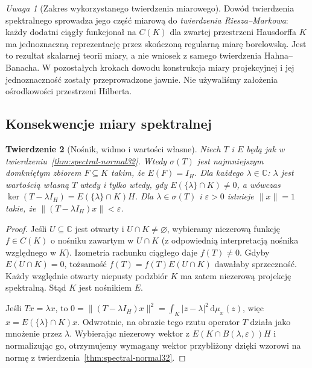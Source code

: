 \documentclass[11pt,a4paper]{article}
\numberwithin{equation}{section}
\theoremstyle{plain}
\newtheorem{twierdzenie}{Twierdzenie}[section]
\theoremstyle{definition}
\theoremstyle{remark}
\newtheorem{uwaga}[twierdzenie]{Uwaga}
\newcommand{\C}{\mathbb C}
\begin{document}
\begin{uwaga}[Zakres wykorzystanego twierdzenia miarowego]
Dowód twierdzenia spektralnego sprowadza jego część miarową
do \emph{twierdzenia Riesza--Markowa}: każdy dodatni ciągły
funkcjonał na $C(K)$ dla zwartej przestrzeni Hausdorffa $K$
ma jednoznaczną reprezentację przez skończoną regularną miarę
borelowską. Jest to rezultat skalarnej teorii miary, a nie
wniosek z samego twierdzenia Hahna--Banacha. W pozostałych
krokach dowodu konstrukcja miary projekcyjnej i jej jednoznaczność
zostały przeprowadzone jawnie. Nie używaliśmy założenia
ośrodkowości przestrzeni Hilberta.
\end{uwaga}

\subsection{Konsekwencje miary spektralnej}

\begin{twierdzenie}[Nośnik, widmo i wartości własne]
\label{thm:spectral-support32}
Niech $T$ i $E$ będą jak w twierdzeniu~\ref{thm:spectral-normal32}.
Wtedy $\sigma(T)$ jest najmniejszym domkniętym zbiorem
$F\subseteq K$ takim, że $E(F)=I_H$.
Dla każdego $\lambda\in\C$:
$\lambda$ jest wartością własną $T$ wtedy i tylko wtedy,
gdy $E(\{\lambda\}\cap K)\ne0$, a wówczas
$\ker(T-\lambda I_H)=E(\{\lambda\}\cap K)H$.
Dla $\lambda\in\sigma(T)$ i $\varepsilon>0$ istnieje
$\|x\|=1$ takie, że $\|(T-\lambda I_H)x\|<\varepsilon$.
\end{twierdzenie}
\begin{proof}
Jeśli $U\subseteq\C$ jest otwarty i $U\cap K\ne\varnothing$,
wybieramy niezerową funkcję $f\in C(K)$ o nośniku
zawartym w $U\cap K$ (z odpowiednią interpretacją
nośnika względnego w $K$).
Izometria rachunku ciągłego daje $f(T)\ne0$.
Gdyby $E(U\cap K)=0$, tożsamość
$f(T)=f(T)E(U\cap K)$ dawałaby sprzeczność.
Każdy względnie otwarty niepusty podzbiór $K$
ma zatem niezerową projekcję spektralną. Stąd
$K$ jest nośnikiem $E$.

Jeśli $Tx=\lambda x$, to
$0=\|(T-\lambda I_H)x\|^2
=\int_K|z-\lambda|^2\,\mathrm d\mu_x(z)$,
więc $x=E(\{\lambda\}\cap K)x$.
Odwrotnie, na obrazie tego rzutu operator $T$ działa
jako mnożenie przez $\lambda$.
Wybierając niezerowy wektor z
$E(K\cap B(\lambda,\varepsilon))H$ i normalizując go,
otrzymujemy wymagany wektor przybliżony dzięki wzorowi
na normę z twierdzenia~\ref{thm:spectral-normal32}.
\end{proof}
\end{document}
